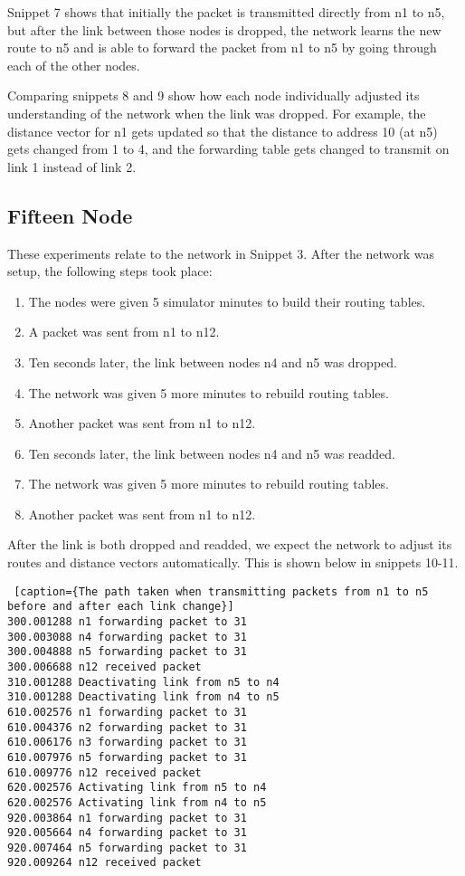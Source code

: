 \documentclass[11pt]{article}
\begin{document}
Snippet 7 shows that initially the packet is transmitted directly from n1 to n5, but after the link between those nodes is dropped, the network learns the new route to n5 and is able to forward the packet from n1 to n5 by going through each of the other nodes.

Comparing snippets 8 and 9 show how each node individually adjusted its understanding of the network when the link was dropped. For example, the distance vector for n1 gets updated so that the distance to address 10 (at n5) gets changed from 1 to 4, and the forwarding table gets changed to transmit on link 1 instead of link 2.


\subsection{Fifteen Node}

These experiments relate to the network in Snippet 3. After the network was setup, the following steps took place:

\begin{enumerate}
  \item The nodes were given 5 simulator minutes to build their routing tables.
  \item A packet was sent from n1 to n12.
  \item Ten seconds later, the link between nodes n4 and n5 was dropped.
  \item The network was given 5 more minutes to rebuild routing tables.
  \item Another packet was sent from n1 to n12.
  \item Ten seconds later, the link between nodes n4 and n5 was readded.
  \item The network was given 5 more minutes to rebuild routing tables.
  \item Another packet was sent from n1 to n12.
\end{enumerate}

After the link is both dropped and readded, we expect the network to adjust its routes and distance vectors automatically. This is shown below in snippets 10-11.

 \begin{lstlisting} [caption={The path taken when transmitting packets from n1 to n5 before and after each link change}]
300.001288 n1 forwarding packet to 31
300.003088 n4 forwarding packet to 31
300.004888 n5 forwarding packet to 31
300.006688 n12 received packet
310.001288 Deactivating link from n5 to n4
310.001288 Deactivating link from n4 to n5
610.002576 n1 forwarding packet to 31
610.004376 n2 forwarding packet to 31
610.006176 n3 forwarding packet to 31
610.007976 n5 forwarding packet to 31
610.009776 n12 received packet
620.002576 Activating link from n5 to n4
620.002576 Activating link from n4 to n5
920.003864 n1 forwarding packet to 31
920.005664 n4 forwarding packet to 31
920.007464 n5 forwarding packet to 31
920.009264 n12 received packet

\end{lstlisting}
\end{document}
